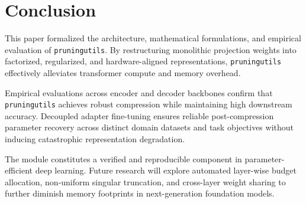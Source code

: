 \section{Conclusion}
This paper formalized the architecture, mathematical formulations, and empirical evaluation of \texttt{pruningutils}. By restructuring monolithic projection weights into factorized, regularized, and hardware-aligned representations, \texttt{pruningutils} effectively alleviates transformer compute and memory overhead.

Empirical evaluations across encoder and decoder backbones confirm that \texttt{pruningutils} achieves robust compression while maintaining high downstream accuracy. Decoupled adapter fine-tuning ensures reliable post-compression parameter recovery across distinct domain datasets and task objectives without inducing catastrophic representation degradation.

The module constitutes a verified and reproducible component in parameter-efficient deep learning. Future research will explore automated layer-wise budget allocation, non-uniform singular truncation, and cross-layer weight sharing to further diminish memory footprints in next-generation foundation models.
